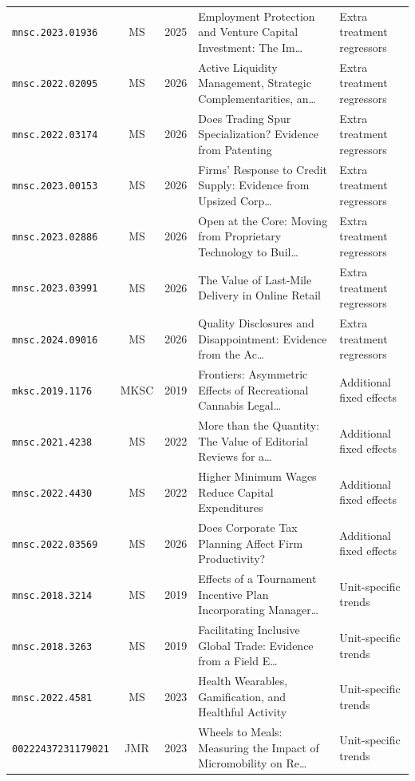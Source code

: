 \begin{longtable}{lccp{}l}
\texttt{mnsc.2023.01936} & MS & 2025 & \raggedright Employment Protection and Venture Capital Investment: The Im\ldots{} & Extra treatment regressors \\
\texttt{mnsc.2022.02095} & MS & 2026 & \raggedright Active Liquidity Management, Strategic Complementarities, an\ldots{} & Extra treatment regressors \\
\texttt{mnsc.2022.03174} & MS & 2026 & \raggedright Does Trading Spur Specialization? Evidence from Patenting & Extra treatment regressors \\
\texttt{mnsc.2023.00153} & MS & 2026 & \raggedright Firms' Response to Credit Supply: Evidence from Upsized Corp\ldots{} & Extra treatment regressors \\
\texttt{mnsc.2023.02886} & MS & 2026 & \raggedright Open at the Core: Moving from Proprietary Technology to Buil\ldots{} & Extra treatment regressors \\
\texttt{mnsc.2023.03991} & MS & 2026 & \raggedright The Value of Last-Mile Delivery in Online Retail & Extra treatment regressors \\
\texttt{mnsc.2024.09016} & MS & 2026 & \raggedright Quality Disclosures and Disappointment: Evidence from the Ac\ldots{} & Extra treatment regressors \\
\texttt{mksc.2019.1176} & MKSC & 2019 & \raggedright Frontiers: Asymmetric Effects of Recreational Cannabis Legal\ldots{} & Additional fixed effects \\
\texttt{mnsc.2021.4238} & MS & 2022 & \raggedright More than the Quantity: The Value of Editorial Reviews for a\ldots{} & Additional fixed effects \\
\texttt{mnsc.2022.4430} & MS & 2022 & \raggedright Higher Minimum Wages Reduce Capital Expenditures & Additional fixed effects \\
\texttt{mnsc.2022.03569} & MS & 2026 & \raggedright Does Corporate Tax Planning Affect Firm Productivity? & Additional fixed effects \\
\texttt{mnsc.2018.3214} & MS & 2019 & \raggedright Effects of a Tournament Incentive Plan Incorporating Manager\ldots{} & Unit-specific trends \\
\texttt{mnsc.2018.3263} & MS & 2019 & \raggedright Facilitating Inclusive Global Trade: Evidence from a Field E\ldots{} & Unit-specific trends \\
\texttt{mnsc.2022.4581} & MS & 2023 & \raggedright Health Wearables, Gamification, and Healthful Activity & Unit-specific trends \\
\texttt{00222437231179021} & JMR & 2023 & \raggedright Wheels to Meals: Measuring the Impact of Micromobility on Re\ldots{} & Unit-specific trends \\

\end{longtable}
